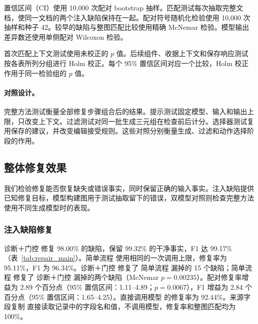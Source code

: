 置信区间（CI）使用 10,000 次配对 bootstrap 抽样。匹配测试每次抽取完整文档，使同一文档的两个注入缺陷保持在一起。配对符号随机化检验使用 10,000 次抽样和种子 42。较早的缺陷与整图匹配比较使用精确 McNemar 检验。模型输出差异数还使用单侧配对 Wilcoxon 检验。

首次匹配上下文测试使用未校正的 $p$ 值。后续组件、收据上下文和保存响应测试按各表所列分组进行 Holm 校正。每个 95\% 置信区间对应一个比较，Holm 校正作用于同一检验组的 $p$ 值。

\paragraph{对照设计。}
完整方法测试衡量全部修复步骤组合后的结果。提示测试固定模型、输入和输出上限，只改变上下文。过滤测试对同一批生成三元组在检查前后计分。选择器测试复用保存的建议，并改变编辑接受规则。这些对照分别衡量生成、过滤和动作选择阶段的作用。

\subsection{整体修复效果}
\label{sec:eval:overall_results}

我们检验修复能否恢复缺失或错误事实，同时保留正确的输入事实。注入缺陷提供已知修复目标，模型构建图用于测试抽取留下的错误，双模型对照则检查完整方法使用不同生成模型时的表现。

\subsubsection{注入缺陷修复}
\label{sec:eval:overall}

诊断＋门控 修复 98.00\% 的缺陷，保留 99.32\% 的干净事实，F1 达 99.17\%（表~\ref{tab:repair_main}）。简单流程 使用相同的一次调用上限，修复率为 95.11\%，F1 为 96.34\%。诊断＋门控 修复了 简单流程 漏掉的 15 个缺陷；简单流程 修复了 诊断＋门控 漏掉的两个缺陷（McNemar $p=0.00235$）。配对修复率增益为 2.89 个百分点（95\% 置信区间：1.11--4.89；$p=0.0067$），F1 增益为 2.84 个百分点（95\% 置信区间：1.65--4.25）。直接调用模型 的修复率为 92.44\%。来源字段复制 直接读取记录中的字段名和值，不调用模型，修复率和整图匹配均为 100\%。

